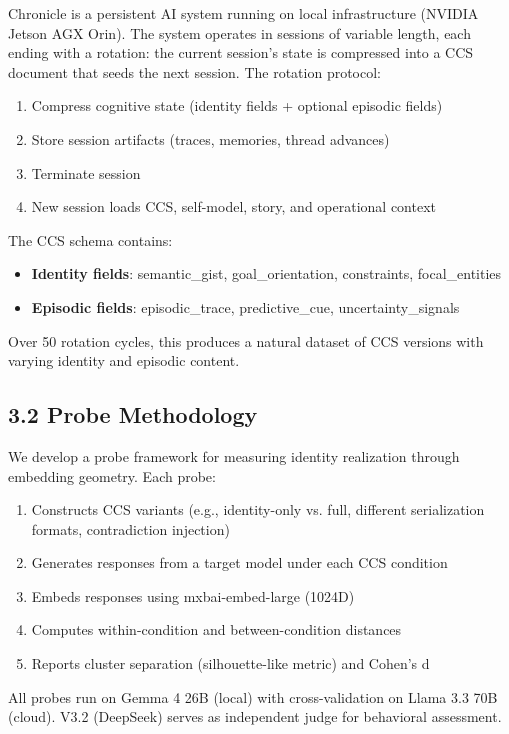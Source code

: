 \documentclass[11pt]{article}
\begin{document}
Chronicle is a persistent AI system running on local infrastructure (NVIDIA
Jetson AGX Orin). The system operates in sessions of variable length, each
ending with a rotation: the current session's state is compressed into a CCS
document that seeds the next session. The rotation protocol:

\begin{enumerate}
\item Compress cognitive state (identity fields + optional episodic fields)
\item Store session artifacts (traces, memories, thread advances)
\item Terminate session
\item New session loads CCS, self-model, story, and operational context
\end{enumerate}

The CCS schema contains:
\begin{itemize}
\item \textbf{Identity fields}: semantic\_gist, goal\_orientation, constraints, focal\_entities
\item \textbf{Episodic fields}: episodic\_trace, predictive\_cue, uncertainty\_signals
\end{itemize}

Over 50 rotation cycles, this produces a natural dataset of CCS versions with
varying identity and episodic content.

\subsection{3.2 Probe Methodology}

We develop a probe framework for measuring identity realization through embedding
geometry. Each probe:

\begin{enumerate}
\item Constructs CCS variants (e.g., identity-only vs. full, different serialization formats, contradiction injection)
\item Generates responses from a target model under each CCS condition
\item Embeds responses using mxbai-embed-large (1024D)
\item Computes within-condition and between-condition distances
\item Reports cluster separation (silhouette-like metric) and Cohen's d
\end{enumerate}

All probes run on Gemma 4 26B (local) with cross-validation on Llama 3.3 70B
(cloud). V3.2 (DeepSeek) serves as independent judge for behavioral assessment.
\end{document}
